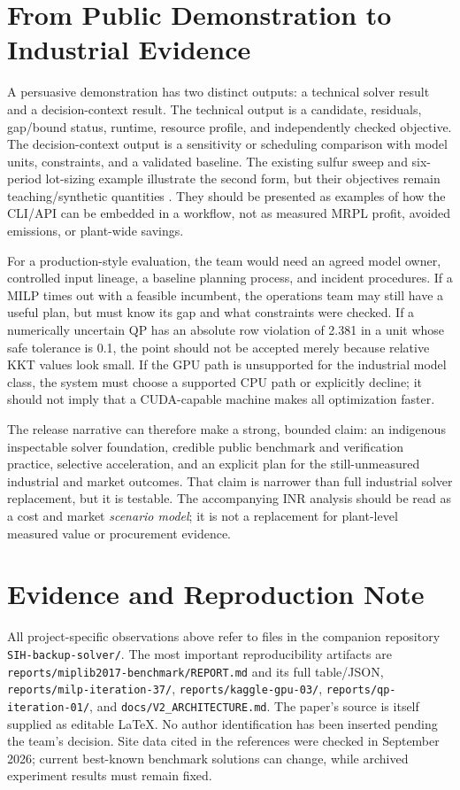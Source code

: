 \documentclass[10pt,a4paper,twocolumn]{article}
\newcommand{\smallpath}[1]{\nolinkurl{#1}}
\begin{document}
\section{From Public Demonstration to Industrial Evidence}

A persuasive demonstration has two distinct outputs: a technical solver result and a decision-context result. The technical output is a candidate, residuals, gap/bound status, runtime, resource profile, and independently checked objective. The decision-context output is a sensitivity or scheduling comparison with model units, constraints, and a validated baseline. The existing sulfur sweep and six-period lot-sizing example illustrate the second form, but their objectives remain teaching/synthetic quantities \cite{demo,industrial}. They should be presented as examples of how the CLI/API can be embedded in a workflow, not as measured MRPL profit, avoided emissions, or plant-wide savings.

For a production-style evaluation, the team would need an agreed model owner, controlled input lineage, a baseline planning process, and incident procedures. If a MILP times out with a feasible incumbent, the operations team may still have a useful plan, but must know its gap and what constraints were checked. If a numerically uncertain QP has an absolute row violation of 2.381 in a unit whose safe tolerance is 0.1, the point should not be accepted merely because relative KKT values look small. If the GPU path is unsupported for the industrial model class, the system must choose a supported CPU path or explicitly decline; it should not imply that a CUDA-capable machine makes all optimization faster.

The release narrative can therefore make a strong, bounded claim: an indigenous inspectable solver foundation, credible public benchmark and verification practice, selective acceleration, and an explicit plan for the still-unmeasured industrial and market outcomes. That claim is narrower than full industrial solver replacement, but it is testable. The accompanying INR analysis should be read as a cost and market \emph{scenario model}; it is not a replacement for plant-level measured value or procurement evidence.

\section*{Evidence and Reproduction Note}

All project-specific observations above refer to files in the companion repository \smallpath{SIH-backup-solver/}. The most important reproducibility artifacts are \smallpath{reports/miplib2017-benchmark/REPORT.md} and its full table/JSON, \smallpath{reports/milp-iteration-37/}, \smallpath{reports/kaggle-gpu-03/}, \smallpath{reports/qp-iteration-01/}, and \smallpath{docs/V2_ARCHITECTURE.md}. The paper's source is itself supplied as editable LaTeX. No author identification has been inserted pending the team's decision. Site data cited in the references were checked in September 2026; current best-known benchmark solutions can change, while archived experiment results must remain fixed.
\end{document}
